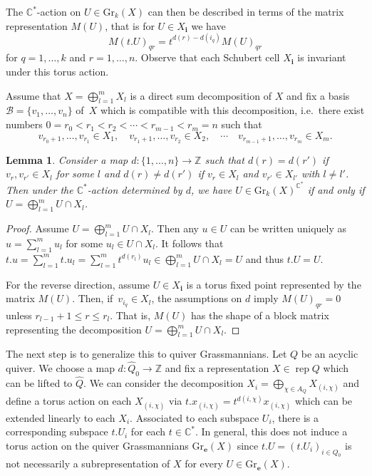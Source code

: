 \documentclass{amsart}
\newtheorem{lemma}[theorem]{Lemma}
\numberwithin{equation}{section}
\newcommand{\bfe}{\mathbf{e}}
\newcommand{\bfi}{\mathbf{i}}
\newcommand{\C}{\mathbb{C}}
\newcommand{\rep}{\operatorname{rep}}
\newcommand{\Gr}{\mathrm{Gr}}
\newcommand{\CC}{\mathbb{C}}
\newcommand{\ZZ}{\mathbb{Z}}
\begin{document}
The $\C^\ast$-action on $U\in\Gr_k(X)$ can then be described in terms of the matrix representation $M(U)$, that is for $U\in X_\bfi$ we have
\[M(t.U)_{qr}=t^{d(r)-d(i_q)} M(U)_{qr}\]
for $q=1,\ldots,k$ and $r=1,\ldots,n$.
Observe that each Schubert cell $X_\bfi$ is invariant under this torus action.

Assume that $X=\bigoplus_{l=1}^m X_l$ is a direct sum decomposition of $X$ and fix a basis $\mathcal B=\{v_1,\ldots,v_n\}$ of~$X$ which is compatible with this decomposition, i.e.\ there exist numbers $0=r_0<r_1<r_2<\cdots<r_{m-1}<r_m=n$ such that
\[v_{r_0+1},\ldots,v_{r_1}\in X_1,\quad v_{r_1+1},\ldots,v_{r_2}\in X_2,\quad\cdots\quad v_{r_{m-1}+1},\ldots,v_{r_m}\in X_m.\]
\begin{lemma}
  \label{le:usualGrass}
  Consider a map $d:\{1,\ldots,n\}\to\ZZ$ such that $d(r)=d(r')$ if $v_r,v_{r'}\in X_l$ for some $l$ and $d(r)\neq d(r')$ if $v_r\in X_l$ and $v_{r'}\in X_{l'}$ with $l\neq l'$.
  Then under the $\CC^*$-action determined by $d$, we have $U\in\Gr_k(X)^{\C^\ast}$ if and only if $U=\bigoplus_{l=1}^m U\cap X_l$.
\end{lemma}
\begin{proof}
  Assume $U=\bigoplus_{l=1}^m U\cap X_l$.
  Then any $u\in U$ can be written uniquely as $u=\sum_{l=1}^m u_l$ for some $u_l\in U\cap X_l$.
  It follows that $t.u=\sum_{l=1}^m t.u_l=\sum_{l=1}^m t^{d(r_l)}u_l\in\bigoplus_{l=1}^m U\cap X_l=U$ and thus $t.U=U$. 

  For the reverse direction, assume $U\in X_{\bfi}$ is a torus fixed point represented by the matrix $M(U)$.
  Then, if~$v_{i_q}\in X_l$, the assumptions on $d$ imply $M(U)_{qr}=0$ unless $r_{l-1}+1\le r\le r_l$.
  That is, $M(U)$ has the shape of a block matrix representing the decomposition $U=\bigoplus_{l=1}^m U\cap X_l$.
\end{proof}
The next step is to generalize this to quiver Grassmannians.
Let $Q$ be an acyclic quiver.
We choose a map $d:\hat Q_0\to\ZZ$ and fix a representation $X\in\rep Q$ which can be lifted to $\hat Q$.
We can consider the decomposition $X_i=\bigoplus_{\chi\in A_Q} X_{(i,\chi)}$ and define a torus action on each $X_{(i,\chi)}$ via $t.x_{(i,\chi)}=t^{d(i,\chi)}x_{(i,\chi)}$ which can be extended linearly to each $X_i$.
Associated to each subspace $U_i$, there is a corresponding subspace $t.U_i$ for each $t\in\CC^*$.
In general, this does not induce a torus action on the quiver Grassmannians $\Gr_\bfe(X)$ since $t.U=(t.U_i)_{i\in Q_0}$ is not necessarily a subrepresentation of $X$ for every $U\in\Gr_\bfe(X)$.
\end{document}
